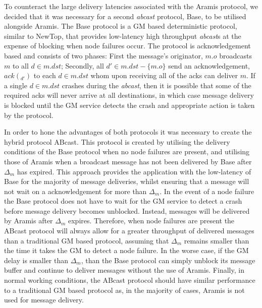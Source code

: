    To counteract the large delivery latencies associated with the \textsf{Aramis} protocol, we decided that it was necessary for a second \emph{abcast} protocol, \textsf{Base}, to be utilised alongside \textsf{Aramis}.  The \textsf{Base} protocol is a GM based deterministic protocol, similar to NewTop\citep{Ezhilchelvan:1995:NFG:876885.880005}, that provides low-latency high throughput \emph{abcast}s at the expense of blocking when node failures occur. The protocol is acknowledgement based and consists of two phases: First the message's originator, $m.o$ broadcasts $m$ to all $d \in m.dst$; Secondly, all $d' \in m.dst - \{m.o\}$ send an acknowledgement, $ack(_{d'})$  to each $d \in m.dst$ whom upon receiving all of the acks can deliver $m$.  If a single $d \in m.dst$ crashes during the \emph{abcast},  then it is possible that some of the required acks will never arrive at all destinations, in which case message delivery is blocked until the GM service detects the crash and appropriate action is taken by the protocol.  
    
    In order to hone the advantages of both protocols it was necessary to create the hybrid protocol \textsf{ABcast}.  This protocol is created by utilising the delivery conditions of the \textsf{Base} protocol when no node failures are present, and utilising those of \textsf{Aramis} when a broadcast message has not been delivered by \textsf{Base} after $\Delta_m$ has expired.  This approach provides the application with the low-latency of \textsf{Base} for the majority of message deliveries, whilst ensuring that a message will not wait on a acknowledgement for more than $\Delta_m$.  In the event of a node failure the \textsf{Base} protocol does not have to wait for the GM service to detect a crash before message delivery becomes unblocked.  Instead, messages will be delivered by \textsf{Aramis} after $\Delta_m$ expires.  Therefore, when node failures are present the \textsf{ABcast} protocol will always allow for a greater throughput of delivered messages than a traditional GM based protocol, assuming that $\Delta_m$ remains smaller than the time it takes the GM to detect a node failure.  In the worse case, if the GM delay is smaller than $\Delta_m$, than the \textsf{Base} protocol can simply unblock its message buffer and continue to deliver messages without the use of \textsf{Aramis}.  Finally, in normal working conditions, the \textsf{ABcast} protocol should have similar performance to a traditional GM based protocol as, in the majority of cases, \textsf{Aramis} is not used for message delivery.  

